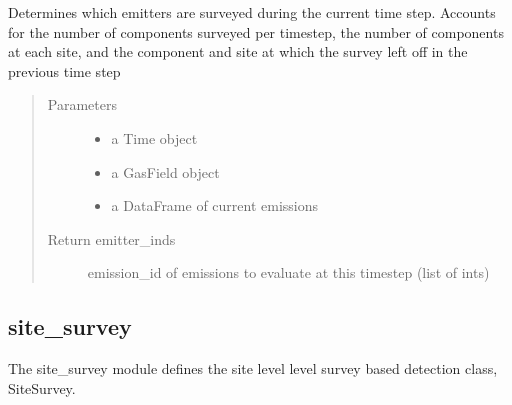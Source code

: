\documentclass[letterpaper,10pt,english]{sphinxmanual}
\begin{document}
\begin{fulllineitems}

\begin{fulllineitems}
\label{\detokenize{index:feast.DetectionModules.comp_survey.CompSurvey.emitters_surveyed}}
Determines which emitters are surveyed during the current time step.
Accounts for the number of components surveyed per timestep, the number of components at each site, and the
component and site at which the survey left off in the previous time step
\begin{quote}\begin{description}
\item[{Parameters}] \leavevmode\begin{itemize}
\item {} 
 \textendash{} a Time object

\item {} 
 \textendash{} a GasField object

\item {} 
 \textendash{} a DataFrame of current emissions

\end{itemize}

\item[{Return emitter\_inds}] \leavevmode
emission\_id of emissions to evaluate at this timestep (list of ints)

\end{description}\end{quote}

\end{fulllineitems}


\end{fulllineitems}



\subsection{site\_survey}
\label{\detokenize{index:module-feast.DetectionModules.site_survey}}\label{\detokenize{index:site-survey}}
The site\_survey module defines the site level level survey based detection class, SiteSurvey.
\end{document}
